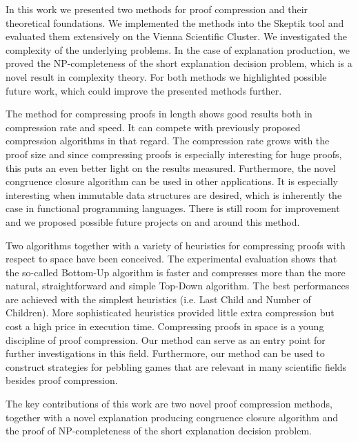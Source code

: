 
In this work we presented two methods for proof compression and their theoretical foundations.
We implemented the methods into the Skeptik tool and evaluated them extensively on the Vienna Scientific Cluster.
We investigated the complexity of the underlying problems.
In the case of explanation production, we proved the NP-completeness of the short explanation decision problem, which is a novel result in complexity theory.
For both methods we highlighted possible future work, which could improve the presented methods further.

The method for compressing proofs in length shows good results both in compression rate and speed.
It can compete with previously proposed compression algorithms in that regard.
The compression rate grows with the proof size and since compressing proofs is especially interesting for huge proofs, this puts an even better light on the results measured.
Furthermore, the novel congruence closure algorithm can be used in other applications.
It is especially interesting when immutable data structures are desired, which is inherently the case in functional programming languages.
There is still room for improvement and we proposed possible future projects on and around this method.

Two algorithms together with a variety of heuristics for compressing proofs with respect to space have been conceived. 
The experimental evaluation shows that the so-called Bottom-Up algorithm is faster and compresses more than the more natural, straightforward and simple Top-Down algorithm. 
The best performances are achieved with the simplest heuristics (i.e. Last Child and Number of Children). 
More sophisticated heuristics provided little extra compression but cost a high price in execution time. 
Compressing proofs in space is a young discipline of proof compression.
Our method can serve as an entry point for further investigations in this field.
Furthermore, our method can be used to construct strategies for pebbling games that are relevant in many scientific fields besides proof compression.

The key contributions of this work are two novel proof compression methods, together with a novel explanation producing congruence closure algorithm and the proof of NP-completeness of the short explanation decision problem.